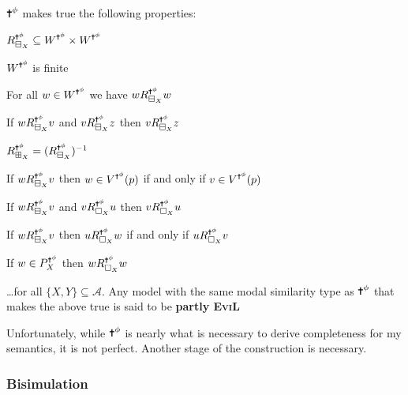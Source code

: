 \begin{lemma}\label{partly}
$\Cross^\phi$ makes true the following properties:
\begin{mynum}
\item $R^{\Cross^\phi}_{\BB_X} \subseteq W^{\Cross^\phi} \times W^{\Cross^\phi}$
\item $W^{\Cross^\phi}$ is finite
\item For all $w \in W^{\Cross^\phi}$ we have $w R^{\Cross^\phi}_{\BB_X} w$ 
\item If $w R^{\Cross^\phi}_{\BB_X} v$ and $v R^{\Cross^\phi}_{\BB_X} z$ then $v R^{\Cross^\phi}_{\BB_X} z$
\item $R^{\Cross^\phi}_{\BBI_X} = (R^{\Cross^\phi}_{\BB_X})^{-1}$
\item If $w R^{\Cross^\phi}_{\BB_X} v$ then $w \in V^{\Cross^\phi}(p)$ if and only if $v \in V^{\Cross^\phi}(p)$
\item If $w R^{\Cross^\phi}_{\BB_X} v$ and $v R^{\Cross^\phi}_{\Nec_X} u$ then $v R^{\Cross^\phi}_{\Nec_X} u$
\item If $w R^{\Cross^\phi}_{\BB_X} v$ then $u R^{\Cross^\phi}_{\Nec_X} w$ if and only if $u R^{\Cross^\phi}_{\Nec_X} v$
\item If $w\in P^{\Cross^\phi}_X$ then $w R^{\Cross^\phi}_{\Nec_X} w$
\end{mynum}
\ldots for all $\{X,Y\} \subseteq \mathcal{A}$.  Any model with the same modal similarity type as $\Cross^\phi$ that makes the above true is said to be \textbf{partly \textsc{EviL}}

\end{lemma}

Unfortunately, while $\Cross^\phi$ is nearly what is necessary to derive completeness for my semantics, it is not perfect.  Another stage of the construction is necessary.

\subsubsection{Bisimulation}

